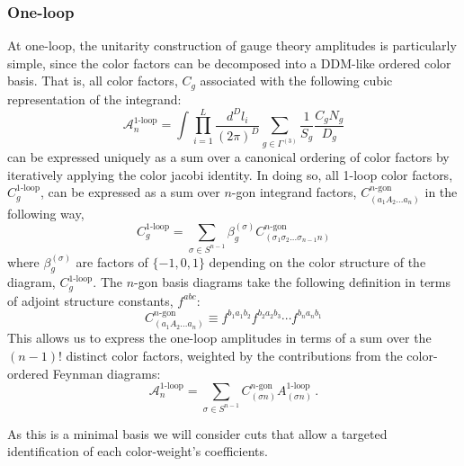 \documentclass[11pt,letter]{article}
\begin{document}
\subsubsection{One-loop}\label{sec:1loopNLSM}
At one-loop, the unitarity construction of gauge theory amplitudes is particularly simple, since the color factors can be decomposed into a DDM-like ordered color basis. That is, all color factors, $C_g$ associated with the following cubic representation of the integrand:
\begin{equation}
\mathcal{A}^{1\text{-loop}}_{n} = \int \prod_{i=1}^L \frac{d^D l_i}{(2\pi)^D} \sum_{g\in \Gamma^{(3)}} \frac{1}{S_g}\frac{C_g N_g}{D_g}
\end{equation}
can be expressed uniquely as a sum over a canonical ordering of color factors by iteratively applying the color jacobi identity. In doing so, all 1-loop color factors, $C^{1\text{-loop}}_g$, can be expressed as a sum over $n$-gon integrand factors, $C^{n\text{-gon}}_{(a_1A_2...a_n)}$ in the following way,
\begin{equation}
C^{1\text{-loop}}_g = \sum_{\sigma\in S^{n-1}} \beta^{(\sigma)}_g C^{n\text{-gon}}_{(\sigma_{1}\sigma_{2}...\sigma_{n-1}n)} 
\end{equation}
where $\beta^{(\sigma)}_g$ are factors of $\{-1,0,1\}$ depending on the color structure of the diagram, $C^{1\text{-loop}}_g$. The $n$-gon basis diagrams take the following definition in terms of adjoint structure constants, $f^{abc}$:
\begin{equation}
C^{n\text{-gon}}_{(a_1A_2...a_n)} \equiv f^{b_1 a_1 b_2}f^{b_2 a_2 b_3}\cdots f^{b_{n} a_{n} b_1}
\end{equation}
This allows us to express the one-loop amplitudes in terms of a sum over the $(n-1)!$ distinct color factors, weighted by the contributions from the color-ordered Feynman diagrams:
\begin{equation}
\mathcal{A}^{1\text{-loop}}_n = \sum_{\sigma \in S^{n-1}} C^{n\text{-gon}}_{(\sigma n)} A^{1\text{-loop}}_{(\sigma n)}\,.
\end{equation}

As this is a minimal basis we will consider cuts that allow a targeted identification of each color-weight's coefficients.
\end{document}
